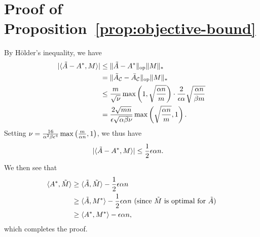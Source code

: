 \section{Proof of Proposition~\ref{prop:objective-bound}}
By H\"{o}lder's inequality, we have 
\begin{align}
|\langle \A-\Aa, M \rangle| &\leq \|\A-\Aa\|_{\op}\|M\|_* \\
 &= \|\A_{\sC}-\Aavg_{\sC}\|_{\op}\|M\|_* \\
 &\leq \frac{m}{\sqrt{\fac}}\max\p{1, \sqrt{\frac{\alpha n}{m}}} \cdot \frac{2}{\epsilon\alpha}\sqrt{\frac{\alpha n}{\beta m}} \\
 &= \frac{2\sqrt{mn}}{\epsilon\sqrt{\alpha\beta\fac}}\max\p{\sqrt{\frac{\alpha n}{m}}, 1}. %
\end{align}
Setting $\nu = \frac{16}{\alpha^2\beta\epsilon^4}\max\left( \frac{m}{\alpha n}, 1 \right)$, 
we thus have
\begin{align}
|\langle \tilde{A}-A^*, M \rangle| &\leq \frac{1}{2}\epsilon \alpha n.
\end{align}
We then see that
\begin{align}
\langle A^*, \tilde{M} \rangle  &\geq \langle \tilde{A}, \tilde{M} \rangle - \frac{1}{2}\epsilon \alpha n \\
 &\geq \langle \tilde{A}, M^* \rangle - \frac{1}{2} \epsilon \alpha n \text{ (since $\tilde{M}$ is optimal for $\tilde{A}$)} \\
 &\geq \langle A^*, M^* \rangle - \epsilon \alpha n,
\end{align}
which completes the proof.


